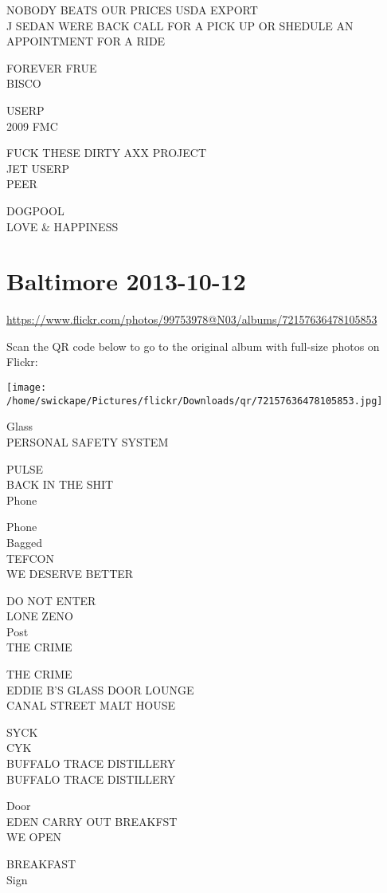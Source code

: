 \documentclass[10pt,letterpaper]{article}
\begin{document}
NOBODY BEATS OUR PRICES USDA EXPORT\\
J SEDAN WERE BACK CALL FOR A PICK UP OR SHEDULE AN APPOINTMENT FOR A RIDE

FOREVER FRUE\\
BISCO

USERP\\
2009 FMC

FUCK THESE DIRTY AXX PROJECT\\
JET USERP\\
PEER

DOGPOOL\\
LOVE \& HAPPINESS
\pagebreak

\section*{Baltimore 2013-10-12}

\url{https://www.flickr.com/photos/99753978@N03/albums/72157636478105853}

Scan the QR code below to go to the original album with full-size photos on Flickr:

\texttt{[image: /home/swickape/Pictures/flickr/Downloads/qr/72157636478105853.jpg]}
\pagebreak

Glass\\
PERSONAL SAFETY SYSTEM

PULSE\\
BACK IN THE SHIT\\
Phone

Phone\\
Bagged\\
TEFCON\\
WE DESERVE BETTER

DO NOT ENTER\\
LONE ZENO\\
Post\\
THE CRIME

THE CRIME\\
EDDIE B'S GLASS DOOR LOUNGE\\
CANAL STREET MALT HOUSE

SYCK\\
CYK\\
BUFFALO TRACE DISTILLERY\\
BUFFALO TRACE DISTILLERY

Door\\
EDEN CARRY OUT BREAKFST\\
WE OPEN

BREAKFAST\\
Sign
\end{document}
